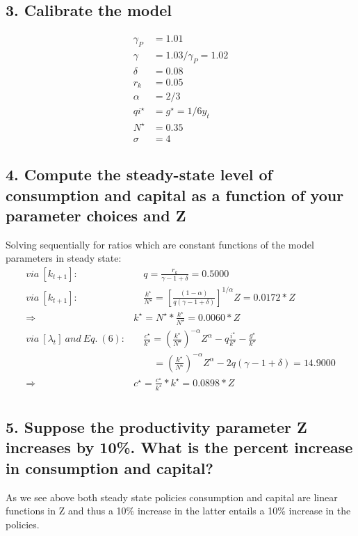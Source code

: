 \documentclass[10pt,letter]{article}
\begin{document}
\subsection*{3. Calibrate the model}
\begin{align}
\gamma_P &= 1.01 \\
\gamma &= 1.03/\gamma_P = 1.02 \\
\delta &= 0.08 \\
r_k &= 0.05 \\
\alpha &= 2/3 \\
qi^\star &= g^\star = 1/6 y_t \\
N^\star &= 0.35 \\
\sigma &= 4
\end{align}

\subsection*{4. Compute the steady-state level of consumption and capital as a function of your parameter choices and Z}
Solving sequentially for ratios which are constant functions of the model parameters in steady state: 
\begin{align*}
	via\ [k_{t+1}]:&\quad q = \frac{r_k}{\gamma -1 + \delta} = 0.5000\\
	via\ [k_{t+1}]:&\quad \frac{k^\star}{N^\star} = \left[ \frac{(1-\alpha)}{q( \gamma -1 + \delta)} \right]^{1/\alpha} Z= 0.0172*Z\\
	\Rightarrow&k^\star = N^\star * \frac{k^\star}{N^\star} = 0.0060*Z\\
	via\ [\lambda_{t}]\ and\ Eq.\ (6):&\quad \frac{c^\star}{k^\star} = \left( \frac{k^\star}{N^\star} \right)^{-\alpha} Z^\alpha - q\frac{i^\star}{k^\star} - \frac{g^\star}{k^\star}\\
&	\qquad = \left( \frac{k^\star}{N^\star} \right)^{-\alpha} Z^\alpha -2q(\gamma - 1 + \delta) = 14.9000\\
\Rightarrow&c^\star =\frac{c^\star}{k^\star}*k^\star = 0.0898*Z\\
\end{align*}

\subsection*{5. Suppose the productivity parameter Z increases by 10\%. What is the percent increase in consumption and capital?}
As we see above both steady state policies consumption and capital are linear functions in Z and thus a 10\% increase in the latter entails a 10\% increase in the policies.
\end{document}
